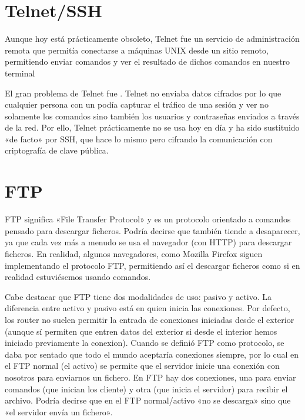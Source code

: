 \documentclass[letterpaper,10pt,spanish]{sphinxmanual}
\begin{document}
\section{Telnet/SSH}
\label{\detokenize{textos/tema4:telnet-ssh}}
Aunque hoy está prácticamente obsoleto, Telnet fue un servicio de administración remota que permitía conectarse a máquinas UNIX desde un sitio remoto, permitiendo enviar comandos y ver el resultado de dichos comandos en nuestro terminal 

El gran problema de Telnet fue . Telnet no enviaba datos cifrados por lo que cualquier persona con un  podía capturar el tráfico de una sesión y ver no solamente los comandos sino también los usuarios y contraseñas enviados a través de la red. Por ello, Telnet prácticamente no se usa hoy en día y ha sido sustituido «de facto» por SSH, que hace lo mismo pero cifrando la comunicación con criptografía de clave pública.


\section{FTP}
\label{\detokenize{textos/tema4:ftp}}
FTP significa «File Transfer Protocol» y es un protocolo orientado a comandos pensado para descargar ficheros. Podría decirse que también tiende a desaparecer, ya que cada vez más a menudo se usa el navegador (con HTTP) para descargar ficheros. En realidad, algunos navegadores, como Mozilla Firefox siguen implementando el protocolo FTP, permitiendo así el descargar ficheros como si en realidad estuviésemos usando comandos.

Cabe destacar que FTP tiene dos modalidades de uso: pasivo y activo. La diferencia entre activo y pasivo está en quien inicia las conexiones. Por defecto, los router no suelen permitir la entrada de conexiones iniciadas desde el exterior (aunque sí permiten que entren datos del exterior si desde el interior hemos iniciado previamente la conexion). Cuando se definió FTP como protocolo, se daba por sentado que todo el mundo aceptaría conexiones siempre, por lo cual en el FTP normal (el activo) se permite que el servidor inicie una conexión con nosotros para enviarnos un fichero. En FTP hay dos conexiones, una para enviar comandos (que inician los cliente) y otra (que inicia el servidor) para recibir el archivo. Podría decirse que en el FTP normal/activo «no se descarga» sino que «el servidor envía un fichero».
\end{document}
